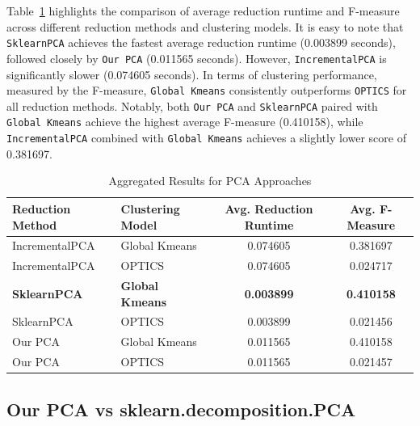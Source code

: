 Table~\ref{tab:aggregated_results} highlights the comparison of average reduction runtime and F-measure across different
reduction methods and clustering models. It is easy to note that \texttt{SklearnPCA} achieves the fastest average
reduction runtime (0.003899 seconds), followed closely by \texttt{Our PCA} (0.011565 seconds).
However, \texttt{IncrementalPCA} is significantly slower (0.074605 seconds).
In terms of clustering performance, measured by the F-measure, \texttt{Global Kmeans} consistently outperforms
\texttt{OPTICS} for all reduction methods. Notably, both \texttt{Our PCA} and \texttt{SklearnPCA} paired with
\texttt{Global Kmeans} achieve the highest average F-measure (0.410158), while \texttt{IncrementalPCA}
combined with \texttt{Global Kmeans} achieves a slightly lower score of 0.381697.

\begin{table}[ht!]
    \centering
    
    \begin{tabular}{l|l|c|c}
    \hline
    \textbf{Reduction Method} & \textbf{Clustering Model} & \textbf{Avg. Reduction Runtime} & \textbf{Avg. F-Measure} \\ \hline
    IncrementalPCA & Global Kmeans & 0.074605 & 0.381697 \\ 
    IncrementalPCA & OPTICS         & 0.074605 & 0.024717 \\ 
    
    \textbf{SklearnPCA}     & \textbf{Global Kmeans} & \textbf{0.003899} & \textbf{0.410158} \\ 
    SklearnPCA     & OPTICS         & 0.003899 & 0.021456 \\ 
    
    Our PCA              & Global Kmeans & 0.011565 & 0.410158 \\ 
    Our PCA           & OPTICS         & 0.011565 & 0.021457 \\ \hline
    \end{tabular}
    \caption{Aggregated Results for PCA Approaches}
    \label{tab:aggregated_results}
\end{table}
    


\subsection{Our PCA vs sklearn.decomposition.PCA}
\label{subsec:pca-vs-scikit-pca}



